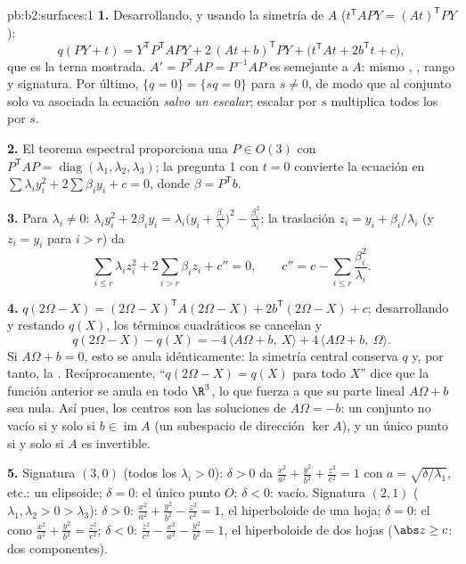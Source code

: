\begin{solution}{pb:b2:surfaces:1}
\textbf{1.} Desarrollando, y usando la simetría de $A$ ($t^{\mathsf
T}\!APY = (At)^{\mathsf T}PY$):
\[
q(PY + t) = Y^{\mathsf T}P^{\mathsf T}\!APY +
2\,(At + b)^{\mathsf T}PY + \bigl(t^{\mathsf T}\!At +
2b^{\mathsf T}t + c\bigr),
\]
que es la terna mostrada. $A' = P^{\mathsf T}\!AP = P^{-1}AP$ es
semejante a $A$: mismo , , rango y
signatura. Por último, $\{q = 0\} = \{sq = 0\}$ para $s \neq 0$, de
modo que al conjunto solo va asociada la ecuación \emph{salvo un
escalar}; escalar por $s$ multiplica todos los  por
$s$.

\textbf{2.} El teorema espectral proporciona una $P \in O(3)$ con
$P^{\mathsf T}\!AP = \operatorname{diag}(\lambda_1, \lambda_2,
\lambda_3)$; la pregunta 1 con $t = 0$ convierte la ecuación en
$\sum\lambda_iy_i^2 + 2\sum\beta_iy_i + c = 0$, donde $\beta =
P^{\mathsf T}b$.

\textbf{3.} Para $\lambda_i \neq 0$: $\lambda_iy_i^2 + 2\beta_iy_i =
\lambda_i\bigl(y_i + \frac{\beta_i}{\lambda_i}\bigr)^2 -
\frac{\beta_i^2}{\lambda_i}$; la traslación $z_i = y_i +
\beta_i/\lambda_i$ (y $z_i = y_i$ para $i > r$) da
\[
\sum_{i \leq r}\lambda_iz_i^2 + 2\sum_{i > r}\beta_iz_i +
c'' = 0, \qquad
c'' = c - \sum_{i\leq r}\frac{\beta_i^2}{\lambda_i}.
\]

\textbf{4.} $q(2\Omega - X) = (2\Omega - X)^{\mathsf T} A(2\Omega -
X) + 2b^{\mathsf T}(2\Omega - X) + c$; desarrollando y restando
$q(X)$, los términos cuadráticos se cancelan y
\[
q(2\Omega - X) - q(X) = -4\,\langle A\Omega + b,\ X\rangle +
4\,\langle A\Omega + b,\ \Omega\rangle .
\]
Si $A\Omega + b = 0$, esto se anula idénticamente: la simetría
central conserva $q$ y, por tanto, la . Recíprocamente,
``$q(2\Omega - X) = q(X)$ para todo $X$'' dice que la función 
anterior se anula en todo $\R^3$, lo que fuerza a que su parte lineal
$A\Omega + b$ sea nula. Así pues, los centros son las soluciones de
$A\Omega = -b$: un conjunto no vacío si y solo si $b \in
\operatorname{im}A$ (un subespacio  de dirección $\ker A$), y un
único punto si y solo si $A$ es invertible.

\textbf{5.} Signatura $(3,0)$ (todos los $\lambda_i > 0$): $\delta >
0$ da $\frac{x^2}{a^2} + \frac{y^2}{b^2} + \frac{z^2}{c^2} = 1$ con
$a = \sqrt{\delta/\lambda_1}$, etc.: un elipsoide; $\delta = 0$: el
único punto $O$; $\delta < 0$: vacío. Signatura $(2,1)$ ($\lambda_1,
\lambda_2 > 0 > \lambda_3$): $\delta > 0$: $\frac{x^2}{a^2} +
\frac{y^2}{b^2} - \frac{z^2}{c^2} = 1$, el hiperboloide de una hoja;
$\delta = 0$: el cono $\frac{x^2}{a^2} + \frac{y^2}{b^2} =
\frac{z^2}{c^2}$; $\delta < 0$: $\frac{z^2}{c^2} - \frac{x^2}{a^2} -
\frac{y^2}{b^2} = 1$, el hiperboloide de dos hojas ($\abs z \geq c$:
dos componentes).


\end{solution}
